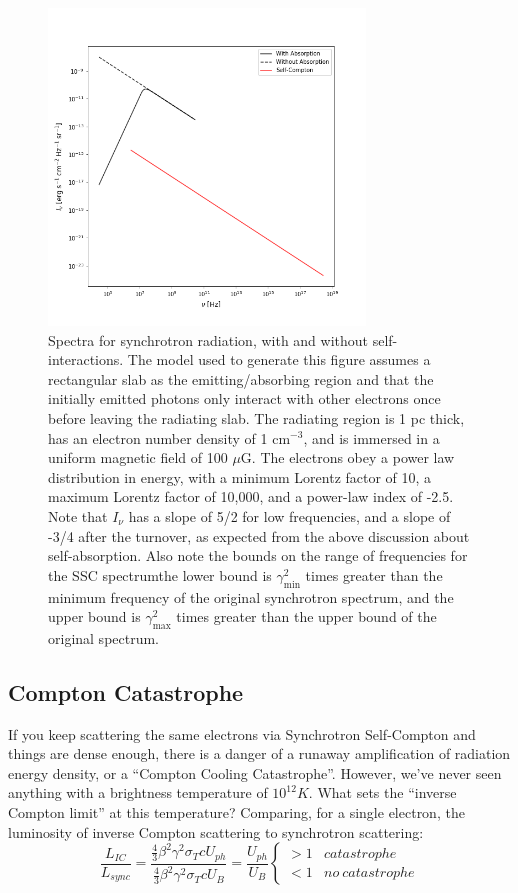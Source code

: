 \documentclass{article}
\begin{document}
\begin{figure}
    \centering
    \includegraphics[width=0.75\textwidth]{Synchrotron_Self_Interaction.png}
    \caption{Spectra for synchrotron radiation, with and without self-interactions. The model used to generate this figure assumes a rectangular slab as the emitting/absorbing region and that the initially emitted photons only interact with other electrons once before leaving the radiating slab. The radiating region is 1 pc thick, has an electron number density of 1 cm$^{-3}$, and is immersed in a uniform magnetic field of 100 $\mu$G. The electrons obey a power law distribution in energy, with a minimum Lorentz factor of 10, a maximum Lorentz factor of 10,000, and a power-law index of -2.5. Note that $I_\nu$ has a slope of 5/2 for low frequencies, and a slope of -3/4 after the turnover, as expected from the above discussion about self-absorption. Also note the bounds on the range of frequencies for the SSC spectrum\textemdash the lower bound is $\gamma_\mathrm{min}^2$ times greater than the minimum frequency of the original synchrotron spectrum, and the upper bound is $\gamma_\mathrm{max}^2$ times greater than the upper bound of the original spectrum.}
    \label{fig:ssc}
\end{figure}

\subsection{ Compton Catastrophe}

\def\gamax{\gamma_{max}}

If you keep scattering the same electrons via Synchrotron Self-Compton and things are dense enough,
there is a danger of a runaway amplification
of radiation energy density, or a ``Compton Cooling Catastrophe''.  However,
we've never seen anything with a brightness temperature of $10^{12}K$.  
What sets the ``inverse Compton limit'' at this temperature?  Comparing,
for a single electron,
the luminosity of inverse Compton scattering to synchrotron scattering:
$$\frac{L_{IC}}{ L_{sync}}=\frac{\frac{4}{3}\beta^2\gamma^2\sigma_TcU_{ph}}{
\frac{4}{3}\beta^2\gamma^2\sigma_TcU_B}=\frac{U_{ph}}{ U_B}
\begin{cases} >1&catastrophe\\ <1 &no\ catastrophe\end{cases}$$
\end{document}
